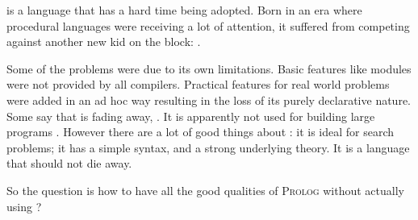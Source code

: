\documentclass[thesis-solanki.tex]{subfiles}
\begin{document}
\begin{comment}
\progLang{Prolog} has a similar story. It was born in an era where procedural programming had made everyone notice their presence. Talking about
competition, it was against something radical; the \progLang{C} programming language. The languages \progLang{C} has influenced is off the chart and
so is the performance. It had paved the way for structured procedural programming and had given birth to the Unix operating system. Though the
original version of \progLang{Prolog} has given rise to a large number of different flavours but a few drawbacks remain through the bloodline and as a
result it did become the first choice. Some basic requirements such as modules are not provided by all compilers. To make it do real world stuff, a set of
practical features are pushed in now and then which results in the loss of the purely declarative charm. The problem is that \progLang{Prolog} is fading
away, \cite{website:prolog-steam,website:prolog-death,website:prolog-killer}, not many people use it and most of the times when it is used, the variant
is usually \textit{practical} \progLang{Prolog} and the area being academia. It is not used for building large programs \cite{wikiprolog,somogyi1995
logic,website:prolog1000db}. But\butbut{} there are a lot of good things about \progLang{Prolog} that should not die away. Moreover, \progLang{Prolog} is ideal
for search problems.
\end{comment}

 is a language that has a hard time being adopted.
Born in an era where procedural languages were receiving a lot of attention, it suffered from competing against
another new kid on the block: .

Some of the problems were due to its own limitations.
Basic features like modules were not provided by all compilers.
Practical features for real world problems were added in an ad hoc way resulting in the loss of its purely
declarative nature.
Some say that  is fading away,
\cite{website:prolog-steam,website:prolog-death,website:prolog-killer}.
It is apparently not used for building large programs \cite{wikiprolog,somogyi1995logic,website:prolog1000db}.
However there are a lot of good things about : it is ideal for search problems; it has a simple
syntax, and a strong underlying theory.
It is a language that should not die away.

So the question is how to have all the good qualities of \textsc{Prolog} without actually using ?
\end{document}

